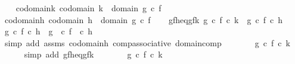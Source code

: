 \begin{isabellebody}
\ \ \isamarkupfalse%
\ codomain{\isacharunderscore}{\kern0pt}k{\isacharcolon}{\kern0pt}\ {\isachardoublequoteopen}codomain\ k\ {\isacharequal}{\kern0pt}\ domain\ {\isacharparenleft}{\kern0pt}g\ {\isasymcirc}\isactrlsub c\ f{\isacharparenright}{\kern0pt}{\isachardoublequoteclose}\isanewline
\ \ \isamarkupfalse%
\ codomain{\isacharunderscore}{\kern0pt}h{\isacharcolon}{\kern0pt}\ {\isachardoublequoteopen}codomain\ h\ {\isacharequal}{\kern0pt}\ domain\ {\isacharparenleft}{\kern0pt}g\ {\isasymcirc}\isactrlsub c\ f{\isacharparenright}{\kern0pt}{\isachardoublequoteclose}\isanewline
\ \ \isamarkupfalse%
\ gfh{\isacharunderscore}{\kern0pt}eq{\isacharunderscore}{\kern0pt}gfk{\isacharcolon}{\kern0pt}\ {\isachardoublequoteopen}{\isacharparenleft}{\kern0pt}g\ {\isasymcirc}\isactrlsub c\ f{\isacharparenright}{\kern0pt}\ {\isasymcirc}\isactrlsub c\ k\ {\isacharequal}{\kern0pt}\ {\isacharparenleft}{\kern0pt}g\ {\isasymcirc}\isactrlsub c\ f{\isacharparenright}{\kern0pt}\ {\isasymcirc}\isactrlsub c\ h{\isachardoublequoteclose}\isanewline
\ \isanewline
\ \ \isamarkupfalse%
\ {\isachardoublequoteopen}g\ {\isasymcirc}\isactrlsub c\ {\isacharparenleft}{\kern0pt}f\ {\isasymcirc}\isactrlsub c\ h{\isacharparenright}{\kern0pt}\ {\isacharequal}{\kern0pt}\ {\isacharparenleft}{\kern0pt}g\ \ {\isasymcirc}\isactrlsub c\ f{\isacharparenright}{\kern0pt}\ \ {\isasymcirc}\isactrlsub c\ h{\isachardoublequoteclose}\isanewline
\ \ \ \ \isamarkupfalse%
\ {\isacharparenleft}{\kern0pt}simp\ add{\isacharcolon}{\kern0pt}\ assms\ codomain{\isacharunderscore}{\kern0pt}h\ comp{\isacharunderscore}{\kern0pt}associative\ domain{\isacharunderscore}{\kern0pt}comp{\isacharparenright}{\kern0pt}\isanewline
\ \ \isamarkupfalse%
\ \isamarkupfalse%
\ {\isachardoublequoteopen}{\isachardot}{\kern0pt}{\isachardot}{\kern0pt}{\isachardot}{\kern0pt}\ {\isacharequal}{\kern0pt}\ {\isacharparenleft}{\kern0pt}g\ {\isasymcirc}\isactrlsub c\ f{\isacharparenright}{\kern0pt}\ {\isasymcirc}\isactrlsub c\ k{\isachardoublequoteclose}\isanewline
\ \ \ \ \isamarkupfalse%
\ {\isacharparenleft}{\kern0pt}simp\ add{\isacharcolon}{\kern0pt}\ gfh{\isacharunderscore}{\kern0pt}eq{\isacharunderscore}{\kern0pt}gfk{\isacharparenright}{\kern0pt}\isanewline
\ \ \isamarkupfalse%
\ \isamarkupfalse%
\ {\isachardoublequoteopen}{\isachardot}{\kern0pt}{\isachardot}{\kern0pt}{\isachardot}{\kern0pt}\ {\isacharequal}{\kern0pt}\ g\ {\isasymcirc}\isactrlsub c\ {\isacharparenleft}{\kern0pt}f\ {\isasymcirc}\isactrlsub c\ k{\isacharparenright}{\kern0pt}{\isachardoublequoteclose}\isanewline

\end{isabellebody}
